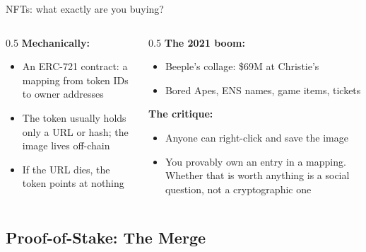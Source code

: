 \ifdefined\PRESENTATION\else\PassOptionsToClass{handout}{beamer}\fi\documentclass[aspectratio=169, lualatex]{beamer}
\begin{document}
\begin{frame}{NFTs: what exactly are you buying?}
	\begin{columns}[c]
		\begin{column}{0.5\textwidth}
			\textbf{Mechanically:}
			\begin{itemize}
				\item An ERC-721 contract: a mapping from token IDs to owner addresses
				\item The token usually holds only a URL or hash; the image lives off-chain
				\item If the URL dies, the token points at nothing
			\end{itemize}
		\end{column}
		\begin{column}{0.5\textwidth}
			\textbf{The 2021 boom:}
			\begin{itemize}
				\item Beeple's collage: \$69M at Christie's
				\item Bored Apes, ENS names, game items, tickets
			\end{itemize}
			\textbf{The critique:}
			\begin{itemize}
				\item Anyone can right-click and save the image
				\item You provably own an entry in a mapping. Whether that is worth anything is a social question, not a cryptographic one
			\end{itemize}
		\end{column}
	\end{columns}
\end{frame}

\subsection{Proof-of-Stake: The Merge}
\end{document}
